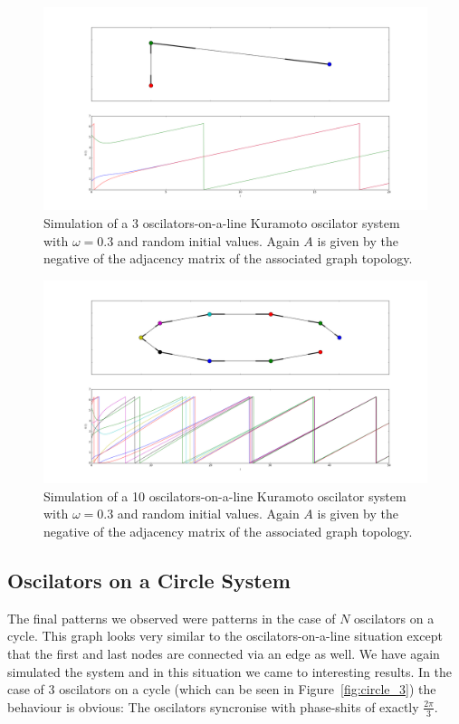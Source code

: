 \begin{figure}[h]
  \centering
  \includegraphics[width=\textwidth]{imgs/line_3}
  \caption{Simulation of a 3 oscilators-on-a-line Kuramoto oscilator system with $\omega = 0.3$ and random initial values. Again $A$ is given by the negative of the adjacency matrix of the associated graph topology. }
  \label{fig:line_3}
\end{figure}

\begin{figure}[h]
  \centering
  \includegraphics[width=\textwidth]{imgs/line_10}
  \caption{Simulation of a 10 oscilators-on-a-line Kuramoto oscilator system with $\omega = 0.3$ and random initial values. Again $A$ is given by the negative of the adjacency matrix of the associated graph topology. }
  \label{fig:line_10}
\end{figure}

\subsection{Oscilators on a Circle System}

The final patterns we observed were patterns in the case of $N$ oscilators on a cycle. This graph looks very similar to the oscilators-on-a-line situation except that the first and last nodes are connected via an edge as well. We have again simulated the system and in this situation we came to interesting results. In the case of $3$ oscilators on a cycle (which can be seen in Figure~\ref{fig:circle_3}) the behaviour is obvious: The oscilators syncronise with phase-shits of exactly $\frac{2 \pi}{3}$. 


